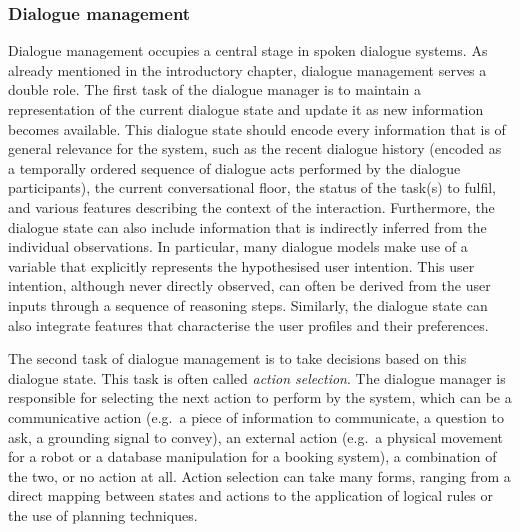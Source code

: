 \subsubsection*{Dialogue management}

Dialogue management occupies a central stage in spoken dialogue systems.  As already mentioned in the introductory chapter, dialogue management serves a double role.  The first task of the dialogue manager is to maintain a representation of the current dialogue state and update it as new information becomes available. This dialogue state should encode every information that is of general relevance for the system, such as the recent dialogue history (encoded as a temporally ordered sequence of dialogue acts performed by the dialogue participants), the current conversational floor, the status of the task(s) to fulfil, and various features describing the context of the interaction.  Furthermore, the dialogue state can also include information that is indirectly inferred from the individual observations. In particular, many dialogue models make use of a variable that explicitly represents the hypothesised user intention.  This user intention, although never directly observed, can often be derived from the user inputs through a sequence of reasoning steps.  Similarly, the dialogue state can also integrate features that characterise the user profiles and their preferences. %

The second task of dialogue management is to take decisions based on this dialogue state.  This task is often called \textit{action selection}.  The dialogue manager is responsible for selecting the next action to perform by the system, which can be a communicative action (e.g.\ a piece of information to communicate, a question to ask, a grounding signal to convey), an external action (e.g.\ a physical movement for a robot or a database manipulation for a booking system), a combination of the two, or no action at all.  Action selection can take many forms, ranging from a direct mapping between states and actions to the application of logical rules or the use of planning techniques. 

